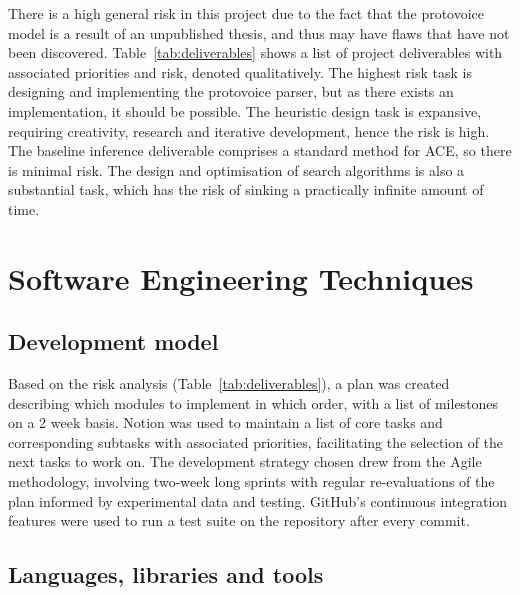 \documentclass[12pt,a4paper,twoside,openright]{report}
\theoremstyle{definition}
\begin{document}
There is a high general risk in this project due to the fact that the protovoice model is a result of an unpublished thesis, and thus may have flaws that have not been discovered. 
Table~\ref{tab:deliverables} shows a list of project deliverables with associated priorities and risk, denoted qualitatively. 
The highest risk task is designing and implementing the protovoice parser, but as there exists an implementation, it should be possible. 
The heuristic design task is expansive, requiring creativity, research and iterative development, hence the risk is high. 
The baseline inference deliverable comprises a standard method for ACE, so there is minimal risk. 
The design and optimisation of search algorithms is also a substantial task, which has the risk of sinking a practically infinite amount of time.


\section{Software Engineering Techniques}

\subsection{Development model}

Based on the risk analysis (Table~\ref{tab:deliverables}), a plan was created describing which modules to implement in which order, with a list of milestones on a 2 week basis. Notion was used to maintain a list of core tasks and corresponding subtasks with associated priorities, facilitating the selection of the next tasks to work on. The development strategy chosen drew from the Agile methodology, involving two-week long sprints with regular re-evaluations of the plan informed by experimental data and testing. GitHub's continuous integration features were used to run a test suite on the repository after every commit.  

\subsection{Languages, libraries and tools}
\end{document}
